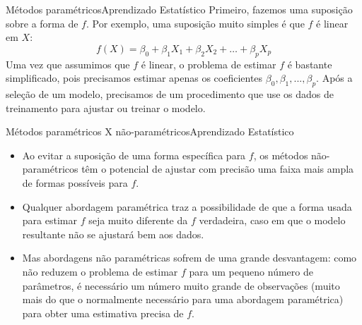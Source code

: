 \documentclass[t]{beamer}
\begin{document}

\begin{ftst}{Métodos paramétricos}{{Aprendizado Estatístico}}
\justifying
Primeiro, fazemos uma suposição sobre a forma de $f$. Por exemplo, uma suposição muito simples é que $f$ é linear em $X$:
\begin{equation}
    f(X) = \beta_0 + \beta_1 X_1 + \beta_2 X_2 + \ldots + \beta_p X_p
\end{equation}
\vone
Uma vez que assumimos que $f$ é linear, o problema de estimar $f$ é bastante simplificado, pois precisamos estimar apenas os coeficientes $\beta_0, \beta_1, ..., \beta_p$.
\vone
Após a seleção de um modelo, precisamos de um procedimento que use os dados de treinamento para ajustar ou treinar o modelo.

\end{ftst}


\begin{ftst}{Métodos paramétricos X não-paramétricos}{{Aprendizado Estatístico}}
\justifying
\begin{itemize}
    \item Ao evitar a suposição de uma forma específica para  $f$, os métodos não-paramétricos têm o potencial de ajustar com precisão uma faixa mais ampla de formas possíveis para $f$.
    \item Qualquer abordagem paramétrica traz a possibilidade de que a forma usada para estimar $f$ seja muito diferente da $f$ verdadeira, caso em que o modelo resultante não se ajustará bem aos dados.
    \item Mas abordagens não paramétricas sofrem de uma grande desvantagem: como não reduzem o problema de estimar $f$ para um pequeno número de parâmetros, é necessário um número muito grande de observações (muito mais do que o normalmente necessário para uma abordagem paramétrica) para obter uma estimativa precisa de $f$.

\end{itemize}

\end{ftst}


\end{document}
